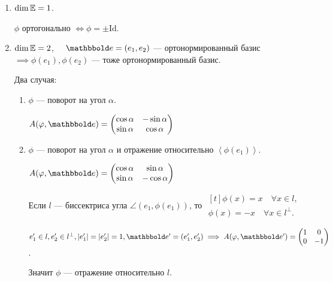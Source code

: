 \begin{enumerate}
\item $\dim \mathbb{E} = 1$.

    $\phi$ ортогонально $\iff \phi = \pm \mathrm{Id}$.

\item $\dim \mathbb{E} = 2$, $\quad \E = (e_1, e_2)$ --- ортонормированный базис $ \implies \phi(e_1), \phi(e_2)$ --- тоже ортонормированный базис.

    Два случая:
    \begin{enumerate}
    \item $\phi$ --- поворот на угол $\alpha$.

        \begin{math}
            A(\phi, \E) = \begin{pmatrix} \cos \alpha & - \sin \alpha \\ \sin \alpha & \cos \alpha \end{pmatrix}
        \end{math}

    \item $\phi$ --- поворот на угол $\alpha$ и отражение относительно $\left< \phi(e_1) \right>$.

        \begin{math}
            A(\phi, \E) = \begin{pmatrix} \cos \alpha & \sin \alpha \\ \sin \alpha & -\cos \alpha \end{pmatrix}
        \end{math}


        Если {\color{red}$l$} --- биссектриса угла $\angle(e_1, \phi(e_1))$, то 
        \begin{math}
            \begin{gathered}[t]
                \phi(x) = x \quad \forall x \in l, \\
                \phi(x) = -x \quad \forall x \in l^{\perp}.
            \end{gathered}
        \end{math}

        \bigskip
        $e'_1 \in l, e'_2 \in l^{\perp}, |e'_1| = |e'_2| = 1, \E' = (e'_1, e'_2) \implies A(\phi, \E') = \begin{pmatrix} 1 & 0 \\ 0 & -1 \end{pmatrix}$.

        Значит $\phi$ --- отражение относительно $l$.
    \end{enumerate}
\end{enumerate}


